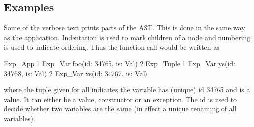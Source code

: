 \subsection{Examples}
\label{sec:eval-normalform-examples}

Some of the verbose text prints parts of the AST. This is done in the same way
as the  application. Indentation is used to mark children of
a node and numbering is used to indicate ordering. Thus the function call
 would be written as

\begin{sml}
Exp_App
  1 Exp_Var foo(id: 34765, is: Val)
  2 Exp_Tuple
      1 Exp_Var ys(id: 34768, is: Val)
      2 Exp_Var xs(id: 34767, is: Val)  
\end{sml}

where the tuple  given for all  indicates
the variable has (unique) id 34765 and is a value. It can either be a value,
constructor or an exception. The id is used to decide whether two variables are
the same (in effect a unique renaming of all variables).

